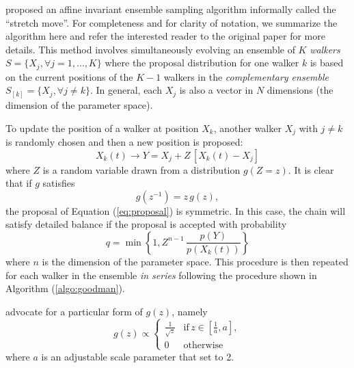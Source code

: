 \documentclass[12pt,preprint]{aastex}
\newcommand{\eq}[1]{Equation (\ref{eq:#1})}
\newcommand{\eqlabel}[1]{\label{eq:#1}}
\newcommand{\algo}[1]{Algorithm (\ref{algo:#1})}
\newcommand{\ensemble}{S}
\renewcommand{\vector}[1]{#1}
\newcommand{\pr}{p}
\begin{document}
 proposed an affine invariant ensemble sampling
algorithm informally called the ``stretch move''. For completeness and for
clarity of notation, we summarize the algorithm here and refer the interested
reader to the original paper for more details. This method involves
simultaneously evolving an ensemble of $K$ \emph{walkers}
$\ensemble = \{ \vector{X_j}, \forall j=1,\ldots,K \}$ where the proposal
distribution for one walker $k$ is based on the current positions of the
$K-1$ walkers in the \emph{complementary ensemble}
$\ensemble_{[k]} = \{ \vector{X_j}, \forall j \ne k \}$. In general, each
$\vector{X_j}$ is also a vector in $N$ dimensions (the dimension
of the parameter space).

To update the position of a walker at position $\vector{X_k}$,
another walker $\vector{X_j}$ with $j \ne k$ is randomly chosen and then
a new position is proposed:
\begin{equation}
    \eqlabel{proposal}
    \vector{X_k} (t) \to \vector{Y} = \vector{X_j}
            + Z \, [\vector{X_k} (t) - \vector{X_j}]
\end{equation}
where $Z$ is a random variable drawn from a distribution $g(Z = z)$.
It is clear that if $g$ satisfies
\begin{equation}
    g(z^{-1}) = z \, g(z),
\end{equation}
the proposal of \eq{proposal} is symmetric. In this case, the chain will
satisfy detailed balance if the proposal is accepted with probability
\begin{equation}
    \eqlabel{acceptance}
    q = \min \left \{ 1, Z^{n-1} \,
                \frac{\pr(\vector{Y})}{\pr(\vector{X_k} (t))} \right \}
\end{equation}
where $n$ is the dimension of the parameter space. This procedure is then
repeated for each walker in the ensemble \emph{in series} following the
procedure shown in \algo{goodman}.

 advocate for a particular form of $g(z)$, namely
\begin{equation}
    \eqlabel{goodmanprop}
    g(z) \propto \left \{ \begin{array}{ll}
        \displaystyle\frac{1}{\sqrt{z}} & \mathrm{if}\, z\in
                        \left [ \displaystyle\frac{1}{a}, a \right ], \\
        0 & \mathrm{otherwise}
    \end{array} \right .
\end{equation}
where $a$ is an adjustable scale parameter that  set
to 2.
\end{document}
